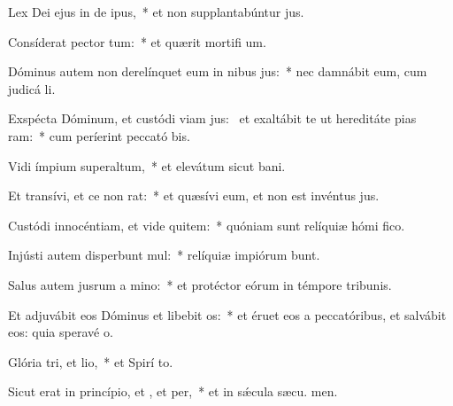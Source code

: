 \item Lex Dei ejus in de ipus,~* et non supplantabúntur  jus.
\item Consíderat pector tum:~* et quærit mortifi um.
\item Dóminus autem non derelínquet eum in nibus jus:~* nec damnábit eum, cum judicá li.
\item Exspécta Dóminum, et custódi viam jus:~\pscross{} et exaltábit te ut hereditáte pias ram:~* cum períerint peccató bis.
\item Vidi ímpium superaltum,~* et elevátum sicut  bani.
\item Et transívi, et ce non rat:~* et quæsívi eum, et non est invéntus  jus.
\item Custódi innocéntiam, et vide quitem:~* quóniam sunt relíquiæ hómi fico.
\item Injústi autem disperbunt mul:~* relíquiæ impiórum bunt.
\item Salus autem jusrum a mino:~* et protéctor eórum in témpore tribunis.
\item Et adjuvábit eos Dóminus et libebit os:~* et éruet eos a peccatóribus, et salvábit eos: quia speravé  o.
\item Glória tri, et lio,~* et Spirí to.
\item Sicut erat in princípio, et , et per,~* et in sǽcula sæcu. men.

